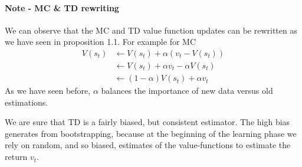 \documentclass[main.tex]{subfiles}
\begin{document}
\paragraph{Note - MC \& TD rewriting} We can observe that the MC and TD value function updates can be rewritten as we have seen in proposition 1.1.
For example for MC
\begin{align*}
    V(s_t) & \leftarrow V(s_t) + \alpha(v_t-V(s_t))        \\
           & \leftarrow V(s_t) + \alpha v_t- \alpha V(s_t) \\
           & \leftarrow (1-\alpha)V(s_t) + \alpha v_t
\end{align*}
As we have seen before, $\alpha$ balances the importance of new data versus old estimations.
\newline
\par
\noindent
We are sure that TD is a fairly biased, but consistent estimator. The high bias generates from bootstrapping, because at the beginning of the learning phase we rely on random, and so biased, estimates of the value-functions to estimate the return $v_t$.
\end{document}
